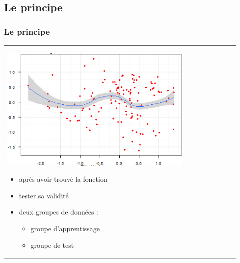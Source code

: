 \documentclass[handout]{beamer}
\begin{document}
	\subsection{Le principe}
		\begin{frame}
		\frametitle{Le principe}
		\begin{tabular}{l l}
			\begin{minipage}{0.5\textwidth}
				\begin{center}
					\includegraphics[width=0.8\textwidth]{images/function.png}
				\end{center}
			\end{minipage}

			\begin{minipage}{0.5\textwidth}
				\begin{itemize}
					\item après avoir trouvé la fonction
					\item tester sa validité
					\item deux groupes de données :
						\begin{itemize}
							\item groupe d'apprentissage
							\item groupe de test
						\end{itemize}
				\end{itemize}
			\end{minipage}
			
		\end{tabular}
		\end{frame}
\end{document}

